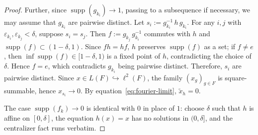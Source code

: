 \documentclass[10pt,a4paper]{amsart}
\newcommand{\supp}{\operatorname{supp}}
\begin{document}
\begin{proof}
Further, since $\supp(g_{k_i})\to 1$, passing to a subsequence if necessary, we may assume that $g_{k_i}$ are pairwise distinct. Let $s_i := g_{k_i}^{-1}\, h\, g_{k_i}$. For any $i, j$ with $\varepsilon_{k_i}, \varepsilon_{k_j} < \delta$, suppose $s_i = s_j$. Then $f := g_{k_j}\, g_{k_i}^{-1}$ commutes with $h$ and $\supp(f) \subset (1 - \delta, 1)$. Since $fh = hf$, $h$ preserves $\supp(f)$ as a set; if $f \neq e$, then $\inf \supp(f) \in [1 - \delta, 1)$ is a fixed point of $h$, contradicting the choice of $\delta$. Hence $f = e$, which contradicts $g_{k_i}$ being pairwise distinct. Therefore, $s_i$ are pairwise distinct.
Since $x \in L(F) \hookrightarrow \ell^2(F)$, the family $(x_g)_{g \in F}$ is square-summable, hence $x_{s_i} \to 0$. By equation~\eqref{eq:fourier-limit}, $\tilde{x}_h = 0$.

The case $\supp(f_k) \to 0$ is identical with $0$ in place of $1$: choose $\delta$ such that $h$ is affine on $[0, \delta]$, the equation $h(x) = x$ has no solutions in $(0, \delta]$, and the centralizer fact runs verbatim.
\end{proof}
\end{document}
